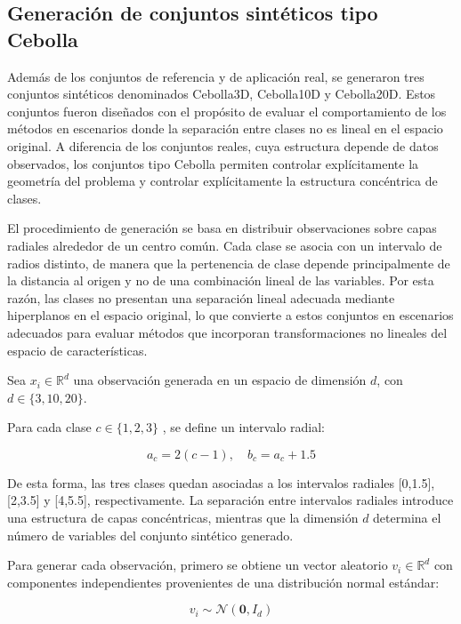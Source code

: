\subsection{Generación de conjuntos sintéticos tipo Cebolla}

Además de los conjuntos de referencia y de aplicación real, se generaron tres conjuntos sintéticos denominados Cebolla3D, Cebolla10D y Cebolla20D. Estos conjuntos fueron diseñados con el propósito de evaluar el comportamiento de los métodos en escenarios donde la separación entre clases no es lineal en el espacio original. A diferencia de los conjuntos reales, cuya estructura depende de datos observados, los conjuntos tipo Cebolla permiten controlar explícitamente la geometría del problema y controlar explícitamente la estructura concéntrica de clases.

El procedimiento de generación se basa en distribuir observaciones sobre capas radiales alrededor de un centro común. Cada clase se asocia con un intervalo de radios distinto, de manera que la pertenencia de clase depende principalmente de la distancia al origen y no de una combinación lineal de las variables. Por esta razón, las clases no presentan una separación lineal adecuada mediante hiperplanos en el espacio original, lo que convierte a estos conjuntos en escenarios adecuados para evaluar métodos que incorporan transformaciones no lineales del espacio de características.

Sea $x_i \in \mathbb{R}^d$ una observación generada en un espacio de dimensión $d$, con $d \in \{3,10,20\}$.

Para cada clase $c \in \{1,2,3\}$ , se define un intervalo radial:

\begin{equation}
	a_c = 2(c-1), \quad b_c = a_c + 1.5
	\label{eq:EM15}
\end{equation}

De esta forma, las tres clases quedan asociadas a los intervalos radiales [0,1.5], [2,3.5] y [4,5.5], respectivamente. La separación entre intervalos radiales introduce una estructura de capas concéntricas, mientras que la dimensión $d$ determina el número de variables del conjunto sintético generado.

Para generar cada observación, primero se obtiene un vector aleatorio $v_i \in \mathbb{R}^d$ con componentes independientes provenientes de una distribución normal estándar:

\begin{equation}
	v_i \sim \mathcal{N}(\mathbf{0}, I_d)	
	\label{eq:EM16}
\end{equation}

